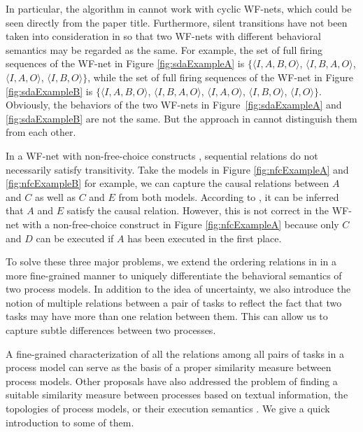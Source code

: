 \documentclass{llncs}
\begin{document}
In particular, the algorithm in \cite{jin2014computing} cannot work with cyclic WF-nets, which could be seen directly from the paper title. Furthermore, silent transitions have not been taken into consideration in \cite{jin2014computing} so that two WF-nets with different behavioral semantics may be regarded as the same. For example, the set of full firing sequences of the WF-net in Figure \ref{fig:sdaExampleA} is $\{\langle I,A,B,O\rangle$, $\langle I,B,A,O\rangle$, $\langle I,A,O\rangle$, $\langle I,B,O\rangle\}$, while the set of full firing sequences of the WF-net in Figure \ref{fig:sdaExampleB} is $\{\langle I,A,B,O\rangle$, $\langle I,B,A,O\rangle$, $\langle I,A,O\rangle$, $\langle I,B,O\rangle$, $\langle I,O\rangle\}$. Obviously, the behaviors of the two WF-nets in Figure~\ref{fig:sdaExampleA} and \ref{fig:sdaExampleB} are not the same. But the approach in \cite{jin2014computing} cannot distinguish them from each other.

In a WF-net with non-free-choice constructs \cite{de2003workflow}, sequential relations do not necessarily satisfy transitivity. Take the models in Figure \ref{fig:nfcExampleA} and \ref{fig:nfcExampleB} for example, we can capture the causal relations between $A$ and $C$ as well as $C$ and $E$ from both models. According to \cite{jin2014computing}, it can be inferred that $A$ and $E$ satisfy the causal relation. However, this is not correct in the WF-net with a non-free-choice construct in Figure \ref{fig:nfcExampleA} because only $C$ and $D$ can be executed if $A$ has been executed in the first place.

To solve these three major problems, we extend the ordering relations in \cite{jin2014computing} in a more fine-grained manner to uniquely differentiate the behavioral semantics of two process models. In addition to the idea of uncertainty, we also introduce the notion of multiple relations between a pair of tasks to reflect the fact that two tasks may have more than one relation between them.  This can allow us to capture subtle differences between two processes.

A fine-grained characterization of all the relations among all pairs of tasks in a process model can serve as the basis of a proper similarity measure between process models. Other proposals have also addressed the problem of finding a suitable similarity measure between processes based on textual information, the topologies of process models, or their execution semantics \cite{weidlich2011efficient}. We give a quick introduction to some of them.
\end{document}
